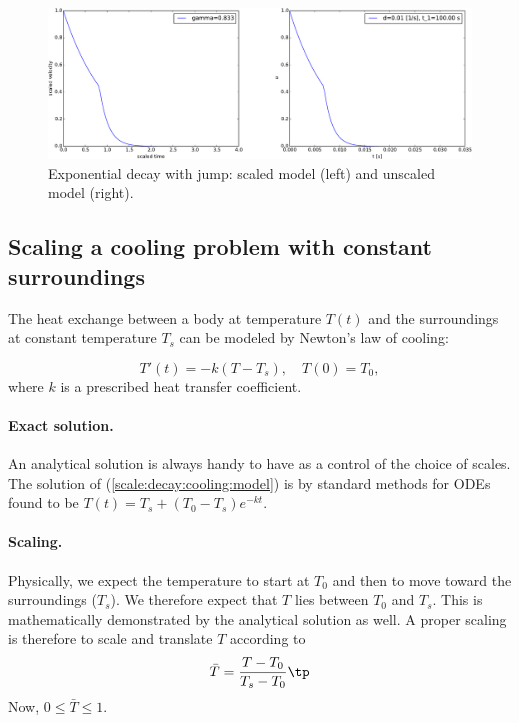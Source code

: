 \documentclass[graybox,envcountchap,sectrefs,final]{svmonodo}
\begin{document}
\begin{figure}[!ht]  %
  \centerline{\includegraphics[width=1.0\linewidth]{fig-scaling/decay_jump.pdf}}
  \caption{
  Exponential decay with jump: scaled model (left) and unscaled model (right). \label{sec:scale:decay:jump:fig}
  }
\end{figure}



\subsection{Scaling a cooling problem with constant surroundings}
\label{scale:decay:cooling:const}

The heat exchange between a body at temperature $T(t)$ and the
surroundings at constant temperature $T_s$
can be modeled by Newton's law of cooling:

\begin{equation}
T'(t) = -k(T-T_s),\quad T(0)=T_0,
\label{scale:decay:cooling:model}
\end{equation}
where $k$ is a prescribed heat transfer coefficient.

\paragraph{Exact solution.}
An analytical solution is always handy to have as a control of the
choice of scales. The solution of (\ref{scale:decay:cooling:model})
is by standard methods for ODEs found to be
$T(t) = T_s + (T_0 - T_s)e^{-kt}$.

\paragraph{Scaling.}
Physically, we expect the temperature to start at $T_0$ and then
to move toward the surroundings ($T_s$). We therefore expect
that $T$ lies between $T_0$ and $T_s$. This is mathematically
demonstrated by the analytical solution as well. A proper scaling
is therefore to scale and translate $T$ according to
\begin{equation}
\bar T = \frac{T-T_0}{T_s-T_0}
\label{scale:decay:cooling:Tbar}
\tp
\end{equation}
Now, $0\leq \bar T\leq 1$.
\end{document}
